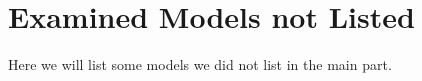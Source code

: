 \chapter{Examined Models not Listed}
\label{chap:app.models}

Here we will list some models we did not list in the main part.

